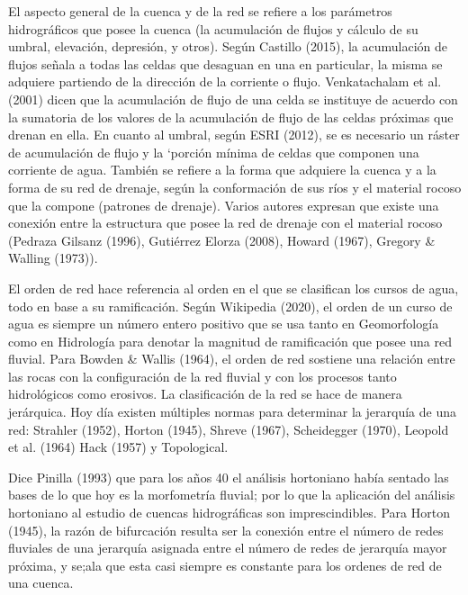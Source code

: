 \documentclass[11pt,]{article}
\begin{document}
El aspecto general de la cuenca y de la red se refiere a los parámetros
hidrográficos que posee la cuenca (la acumulación de flujos y cálculo de
su umbral, elevación, depresión, y otros). Según Castillo (2015), la
acumulación de flujos señala a todas las celdas que desaguan en una en
particular, la misma se adquiere partiendo de la dirección de la
corriente o flujo. Venkatachalam et al. (2001) dicen que la acumulación
de flujo de una celda se instituye de acuerdo con la sumatoria de los
valores de la acumulación de flujo de las celdas próximas que drenan en
ella. En cuanto al umbral, según ESRI (2012), se es necesario un ráster
de acumulación de flujo y la `porción mínima de celdas que componen una
corriente de agua. También se refiere a la forma que adquiere la cuenca
y a la forma de su red de drenaje, según la conformación de sus ríos y
el material rocoso que la compone (patrones de drenaje). Varios autores
expresan que existe una conexión entre la estructura que posee la red de
drenaje con el material rocoso (Pedraza Gilsanz (1996), Gutiérrez Elorza
(2008), Howard (1967), Gregory \& Walling (1973)).

El orden de red hace referencia al orden en el que se clasifican los
cursos de agua, todo en base a su ramificación. Según Wikipedia (2020),
el orden de un curso de agua es siempre un número entero positivo que se
usa tanto en Geomorfología como en Hidrología para denotar la magnitud
de ramificación que posee una red fluvial. Para Bowden \& Wallis (1964),
el orden de red sostiene una relación entre las rocas con la
configuración de la red fluvial y con los procesos tanto hidrológicos
como erosivos. La clasificación de la red se hace de manera jerárquica.
Hoy día existen múltiples normas para determinar la jerarquía de una
red: Strahler (1952), Horton (1945), Shreve (1967), Scheidegger (1970),
Leopold et al. (1964) Hack (1957) y Topological.

Dice Pinilla (1993) que para los años 40 el análisis hortoniano había
sentado las bases de lo que hoy es la morfometría fluvial; por lo que la
aplicación del análisis hortoniano al estudio de cuencas hidrográficas
son imprescindibles. Para Horton (1945), la razón de bifurcación resulta
ser la conexión entre el número de redes fluviales de una jerarquía
asignada entre el número de redes de jerarquía mayor próxima, y se;ala
que esta casi siempre es constante para los ordenes de red de una
cuenca.
\end{document}
